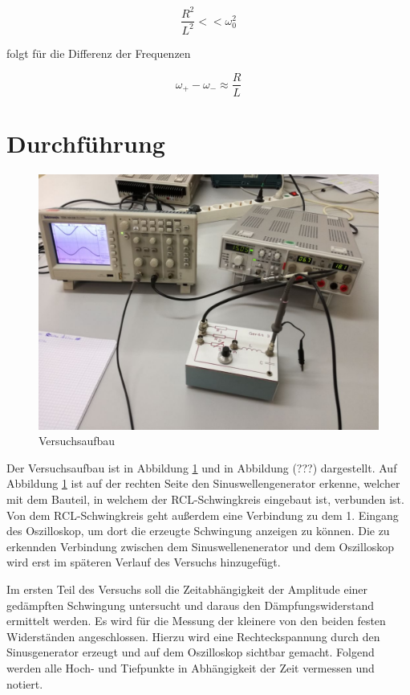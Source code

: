  \begin{equation*}
   \frac{R^2}{L^2} << \omega_0^2
 \end{equation*}

folgt für die Differenz der Frequenzen

\begin{equation*}
\omega_+ - \omega_- \approx \frac{R}{L}
\end{equation*}

 \section{Durchführung}

 \begin{figure}[h]
   \centering
   \includegraphics[scale=0.2]{V354Aufbau.jpeg}
   \caption{Versuchsaufbau}
   \label{AufbauBild}
 \end{figure}

Der Versuchsaufbau ist in Abbildung \ref{AufbauBild} und in Abbildung (???) dargestellt. Auf Abbildung \ref{AufbauBild} ist auf der rechten
Seite den Sinuswellengenerator erkenne, welcher mit dem Bauteil, in welchem der RCL-Schwingkreis eingebaut ist, verbunden
ist. Von dem RCL-Schwingkreis geht außerdem eine Verbindung zu dem 1. Eingang des Oszilloskop, um dort die erzeugte Schwingung
anzeigen zu können. Die zu erkennden Verbindung zwischen dem Sinuswellenenerator und dem Oszilloskop wird erst im späteren Verlauf
des Versuchs hinzugefügt.

Im ersten Teil des Versuchs soll die Zeitabhängigkeit der Amplitude einer gedämpften Schwingung untersucht und
daraus den Dämpfungswiderstand ermittelt werden. Es wird für die Messung der kleinere von den beiden festen Widerständen
angeschlossen. Hierzu wird eine Rechteckspannung durch den Sinusgenerator erzeugt
und auf dem Oszilloskop sichtbar gemacht. Folgend werden alle Hoch- und Tiefpunkte in Abhängigkeit der Zeit vermessen
und notiert.

